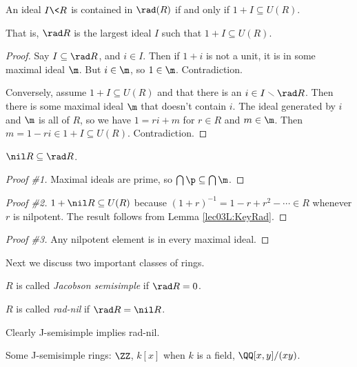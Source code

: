  \begin{lemma}\label{lec03L:KeyRad}
   An ideal $I\< R$ is contained in $\rad (R)$ if and only if $1+I\subseteq U(R)$.
 \end{lemma}
 That is, $\rad R$ is the largest ideal $I$ such that $1+I\subseteq U(R)$.
 \begin{proof}
   Say $I\subseteq \rad R$, and $i\in I$. Then if $1+i$ is not a unit, it is in some
   maximal ideal $\m$. But $i\in \m$, so $1\in\m$. Contradiction.

   Conversely, assume $1+I\subseteq U(R)$ and that there is an $i\in I\smallsetminus\rad
   R$. Then there is some maximal ideal $\m$ that doesn't contain $i$. The ideal
   generated by $i$ and $\m$ is all of $R$, so we have $1=ri+m$ for $r\in R$ and $m\in
   \m$. Then $m=1-ri\in 1+I\subseteq U(R)$. Contradiction.
 \end{proof}

 \begin{lemma}
   $\nil R\subseteq \rad R$.
 \end{lemma}
 \begin{proof}[Proof \#1]
   Maximal ideals are prime, so $\bigcap \p\subseteq \bigcap \m$.
 \end{proof}
 \begin{proof}[Proof \#2]
   $1+\nil R\subseteq U(R)$ because $(1+r)^{-1}=1-r+r^2-\cdots \in R$ whenever $r$ is
   nilpotent. The result follows from Lemma \ref{lec03L:KeyRad}.
 \end{proof}
 \begin{proof}[Proof \#3]
   Any nilpotent element is in every maximal ideal.
 \end{proof}

 Next we discuss two important classes of rings.
 \begin{definition}
   $R$ is called \emph{Jacobson semisimple} if $\rad R=0$.
 \end{definition}
 \begin{definition}
   $R$ is called \emph{rad-nil} if $\rad R=\nil R$.
 \end{definition}
 Clearly J-semisimple implies rad-nil.
 \begin{example}
   Some J-semisimple rings: $\ZZ$, $k[x]$ when $k$ is a field, $\QQ[x,y]/(xy)$.
 \end{example}

